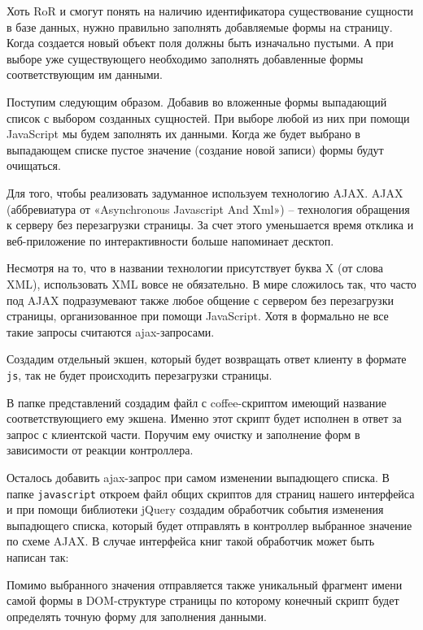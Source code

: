 Хоть RoR и смогут понять на наличию идентификатора существование сущности
в базе данных, нужно правильно заполнять добавляемые формы на
страницу. Когда создается новый объект поля должны быть изначально
пустыми. А при выборе уже существующего необходимо
заполнять добавленные формы соответствующим им данными.

Поступим следующим образом. Добавив во вложенные формы выпадающий список
с выбором созданных сущностей. При выборе любой из них при помощи JavaScript
мы будем заполнять их данными. Когда же будет выбрано в выпадающем списке
пустое значение (создание новой записи) формы будут очищаться.

Для того, чтобы реализовать задуманное используем технологию AJAX.
AJAX (аббревиатура от «Asynchronous Javascript And Xml») – технология
обращения к серверу без перезагрузки страницы. За счет этого
уменьшается время отклика и веб-приложение по
интерактивности больше напоминает десктоп.

Несмотря на то, что в названии технологии присутствует буква X
(от слова XML), использовать XML вовсе не обязательно.
В мире сложилось так, что часто под AJAX подразумевают также
любое общение с сервером без перезагрузки
страницы, организованное при помощи JavaScript. Хотя в формально
не все такие запросы считаются ajax-запросами.

Создадим отдельный экшен, который будет возвращать ответ клиенту в
формате \texttt{js}, так не будет происходить перезагрузки страницы.

В папке представлений создадим файл с coffee-скриптом имеющий название
соответствующиего ему экшена. Именно этот скрипт
будет исполнен в ответ за запрос
с клиентской части.
Поручим ему очистку и заполнение форм
в зависимости от реакции контроллера.

Осталось добавить ajax-запрос при самом изменении выпадющего списка.
В папке \texttt{javascript} откроем файл общих скриптов для
страниц нашего интерфейса и при помощи библиотеки jQuery
создадим обработчик события изменения выпадющего списка,
который будет отправлять в контроллер выбранное значение
по схеме AJAX. В случае интерфейса книг такой обработчик
может быть написан так:
\begin{small}

\end{small}
\noindent
Помимо выбранного значения отправляется также уникальный фрагмент имени
самой формы в DOM-структуре страницы по которому конечный скрипт
будет определять точную форму для заполнения данными.

